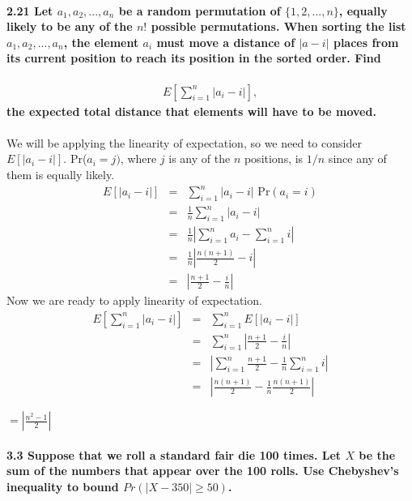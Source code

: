 \documentclass{article}
\begin{document}
\paragraph{2.21 Let $a_1, a_2, ..., a_n$ be a random permutation of 
$\{1, 2, ..., n\}$, equally likely to be any of the $n!$ possible permutations. 
When sorting the list $a_1, a_2, ..., a_n$, the element $a_i$ must move a 
distance of $|a-i|$ places from its current position to reach its 
position in the sorted order. Find}
\begin{eqnarray*}
E\left[\sum_{i=1}^n |a_i-i|\right],
\end{eqnarray*}
\textbf{the expected total distance that elements will have to be moved.\\\\}
We will be applying the linearity of expectation, so we need to consider
$E[|a_i-i|]$. Pr($a_i=j)$, where $j$ is any of the $n$ positions, is $1/n$
since any of them is equally likely.
\begin{eqnarray*}
E[|a_i-i|] & = & \sum_{i=1}^n |a_i-i|\mbox{ Pr}(a_i=i)\\
	& = & \frac{1}{n}\sum_{i=1}^n |a_i-i|\\
	& = & \frac{1}{n}\left|\sum_{i=1}^n a_i-\sum_{i=1}^n i\right|\\
	& = & \frac{1}{n}\left|\frac{n(n+1)}{2}-i\right|\\
	& = & \left|\frac{n+1}{2}-\frac{i}{n}\right|
\end{eqnarray*}
Now we are ready to apply linearity of expectation.
\begin{eqnarray*}
E\left[\sum_{i=1}^n |a_i-i|\right] & = & \sum_{i=1}^n E[|a_i-i|]\\
	& = & \sum_{i=1}^n \left|\frac{n+1}{2}-\frac{i}{n}\right|\\
	& = & \left|\sum_{i=1}^n \frac{n+1}{2}-\frac{1}{n}\sum_{i=1}^n i\right|\\
	& = & \left|\frac{n(n+1)}{2}-\frac{1}{n}\frac{n(n+1)}{2}\right|
\end{eqnarray*}
\begin{center}
$\boxed{=\left|\frac{n^2-1}{2}\right|}$
\end{center}

\paragraph{3.3 Suppose that we roll a standard fair die 100 times. Let $X$ 
be the sum of the numbers that appear over the 100 rolls. Use Chebyshev's 
inequality to bound ${Pr(|X - 350| \geq 50)}$.}
\end{document}
